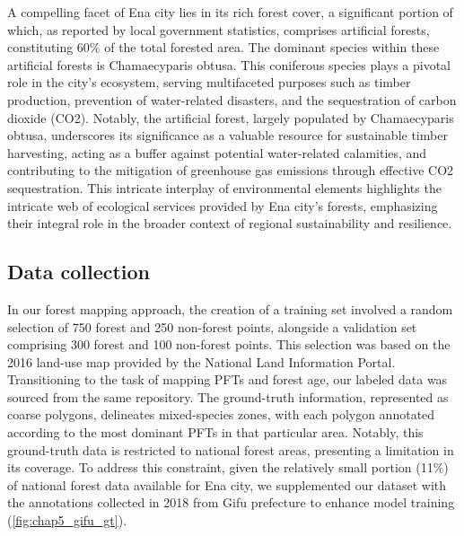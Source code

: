A compelling facet of Ena city lies in its rich forest cover, a significant portion of which, as reported by local government statistics, comprises artificial forests, constituting 60\% of the total forested area. The dominant species within these artificial forests is Chamaecyparis obtusa. This coniferous species plays a pivotal role in the city's ecosystem, serving multifaceted purposes such as timber production, prevention of water-related disasters, and the sequestration of carbon dioxide (CO2). Notably, the artificial forest, largely populated by Chamaecyparis obtusa, underscores its significance as a valuable resource for sustainable timber harvesting, acting as a buffer against potential water-related calamities, and contributing to the mitigation of greenhouse gas emissions through effective CO2 sequestration. This intricate interplay of environmental elements highlights the intricate web of ecological services provided by Ena city's forests, emphasizing their integral role in the broader context of regional sustainability and resilience. \par

\subsection{Data collection}
In our forest mapping approach, the creation of a training set involved a random selection of 750 forest and 250 non-forest points, alongside a validation set comprising 300 forest and 100 non-forest points. This selection was based on the 2016 land-use map provided by the National Land Information Portal. Transitioning to the task of mapping PFTs and forest age, our labeled data was sourced from the same repository. The ground-truth information, represented as coarse polygons, delineates mixed-species zones, with each polygon annotated according to the most dominant PFTs in that particular area. Notably, this ground-truth data is restricted to national forest areas, presenting a limitation in its coverage. To address this constraint, given the relatively small portion (11\%) of national forest data available for Ena city, we supplemented our dataset with the annotations collected in 2018 from Gifu prefecture to enhance model training (\ref{fig:chap5_gifu_gt}). \par


